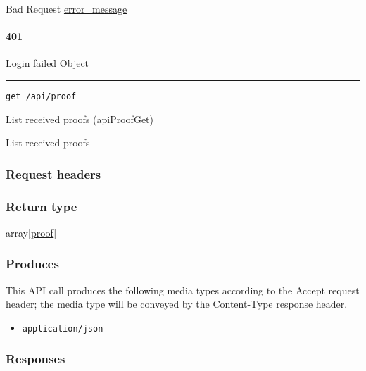 Bad Request \protect\hyperlink{error_message}{error\_message}

\hypertarget{section-534}{%
\paragraph{401}\label{section-534}}

Login failed \protect\hyperlink{Object}{Object}

\begin{center}\rule{0.5\linewidth}{\linethickness}\end{center}

\protect\hypertarget{apiProofGet}{}{}

\begin{verbatim}
get /api/proof
\end{verbatim}

List received proofs ({apiProofGet})

List received proofs

\hypertarget{request-headers-88}{%
\subsubsection{Request headers}\label{request-headers-88}}

\hypertarget{return-type-127}{%
\subsubsection{Return type}\label{return-type-127}}

array{[}\protect\hyperlink{proof}{proof}{]}

\hypertarget{produces-161}{%
\subsubsection{Produces}\label{produces-161}}

This API call produces the following media types according to the
{Accept} request header; the media type will be conveyed by the
{Content-Type} response header.

\begin{itemize}
\tightlist
\item
  \texttt{application/json}
\end{itemize}

\hypertarget{responses-166}{%
\subsubsection{Responses}\label{responses-166}}

